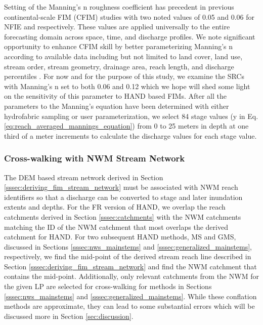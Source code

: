 \documentclass[draft]{dependencies/agujournal2019}
\begin{document}
Setting of the Manning's n roughness coefficient has precedent in previous continental-scale FIM (CFIM) studies \cite{maidment2017conceptual,liu2016cybergis,liu2020height,djokic2019arc,garousi2019terrain,zheng2018geoflood} with two noted values of 0.05 and 0.06 for NFIE and  respectively. 
These values are applied universally to the entire forecasting domain across space, time, and discharge profiles.
We note significant opportunity to enhance CFIM skill by better parameterizing Manning's n according to available data including but not limited to land cover, land use, stream order, stream geometry, drainage area, reach length, and discharge percentiles \cite{garousi2019terrain,johnson2019integrated}.
For now and for the purpose of this study, we examine the SRCs with Manning's n set to both 0.06 and 0.12 which we hope will shed some light on the sensitivity of this parameter to HAND based FIMs.
After all the parameters to the Manning's equation have been determined with either hydrofabric sampling or user parameterization, we select 84 stage values (y in Eq. \ref{eq:reach_averaged_mannings_equation}) from 0 to 25 meters in depth at one third of a meter increments to calculate the discharge values for each stage value. 
%
\subsubsection{Cross-walking with NWM Stream Network}
\label{sssec:cross_walking_networks}
%
The DEM based stream network derived in Section \ref{sssec:deriving_fim_stream_network} must be associated with NWM reach identifiers so that a discharge can be converted to stage and later inundation extents and depths.
For the FR version of HAND, we overlap the reach catchments derived in Section \ref{sssec:catchments} with the NWM catchments matching the ID of the NWM catchment that most overlaps the derived catchment for HAND.
For two subsequent HAND methods, MS and GMS, discussed in Sections \ref{sssec:nws_mainstems} and \ref{sssec:generalized_mainstems}, respectively, we find the mid-point of the derived stream reach line described in Section \ref{sssec:deriving_fim_stream_network} and find the NWM catchment that contains the mid-point.
Additionally, only relevant catchments from the NWM for the given LP are selected for cross-walking for methods in Sections \ref{sssec:nws_mainstems} and \ref{sssec:generalized_mainstems}.
While these conflation methods are approximate, they can lead to some substantial errors which will be discussed more in Section \ref{sec:discussion}.
%
\end{document}
